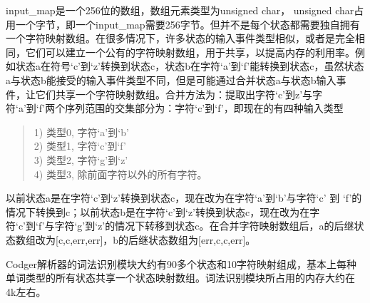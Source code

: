 \documentclass[a4paper,11pt]{article}
\begin{document}
\begin{CJK}{UTF8}{gbsn}
input\_map是一个256位的数组，数组元素类型为unsigned char， unsigned char占用一个字节，即一个input\_map需要256字节。但并不是每个状态都需要独自拥有一个字符映射数组。在很多情况下，许多状态的输入事件类型相似，或者是完全相同，它们可以建立一个公有的字符映射数组，用于共享，以提高内存的利用率。例如状态a在符号`c'到`z'转换到状态c，状态b在字符`a'到`f'能转换到状态c，虽然状态a与状态b能接受的输入事件类型不同，但是可能通过合并状态a与状态b输入事件，让它们共享一个字符映射数组。合并方法为：提取出字符`c'到z'与字符`a'到`f'两个序列范围的交集部分为：字符`c'到`f'，即现在的有四种输入类型
\begin{quote}
1) 类型0, 字符`a'到`b' \\
2) 类型1, 字符`c'到`f' \\
3) 类型2, 字符`g'到`z' \\
4) 类型3, 除前面字符以外的所有字符。 
\end{quote}
以前状态a是在字符`c'到`z'转换到状态c，现在改为在字符`a'到`b'与字符`c' 到 `f'的情况下转换到c；以前状态b是在字符`c'到`z'转换到状态c，现在改为在字符`c'到`f'与字符`g'到`z'的情况下转移到状态c。在合并字符映射数组后，a的后继状态数组改为[c,c,err,err]，b的后继状态数组为[err,c,c,err]。

Codger解析器的词法识别模块大约有90多个状态和10字符映射组成，基本上每种单词类型的所有状态共享一个状态映射数组。词法识别模块所占用的内存大约在4k左右。

\end{CJK}
\end{document}
